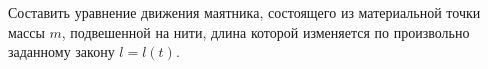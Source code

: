 Составить уравнение движения маятника, состоящего из материальной точки массы $m$,
подвешенной на нити, длина которой изменяется по произвольно заданному закону $l = l(t)$.

